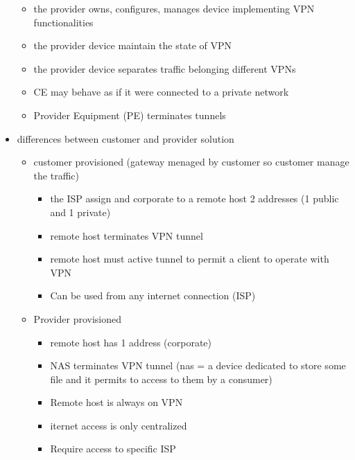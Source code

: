 \documentclass{article}
\begin{document}
\begin{itemize}
\begin{figure}[H]
    \end{figure}
    \begin{itemize}
        \item the provider owns, configures, manages device implementing VPN functionalities
        \item the provider device maintain the state of VPN
        \item the provider device separates traffic belonging different VPNs
        \item CE may behave as if it were connected to a private network
        \item Provider Equipment (PE) terminates tunnels
    \end{itemize}
    \item differences between customer and provider solution
    \begin{itemize}
        \item customer provisioned (gateway menaged by customer so customer manage the traffic)
        \begin{itemize}
            \item the ISP assign and corporate to a remote host 2 addresses (1 public and 1 private)
            \item remote host terminates VPN tunnel
            \item remote host must active tunnel to permit a client to operate with VPN
            \item Can be used from any internet connection (ISP)
        \end{itemize}
        \item Provider provisioned
        \begin{itemize}
            \item remote host has 1 address (corporate)
            \item NAS terminates VPN tunnel (nas = a device dedicated to store some file and it permits to access to them by a consumer)
            \item Remote host is always on VPN
            \item iternet access is only centralized
            \item Require access to specific ISP
        \end{itemize}
    \end{itemize}
\end{itemize}
\end{document}
